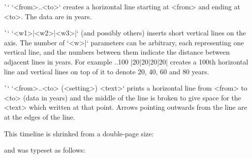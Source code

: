 {{{{\`\tline` `<from>..<to>` creates a horizontal line starting at <from> and
ending at <to>. The data are in years.

\`\tlines` `<w1>|<w2>|<w3>|` (and possibly others) inserts short vertical lines on the axis.
The number of `<w>|` parameters can be arbitrary, each representing one
vertical line, and the numbers between them indicate the distance between adjacent lines in
years. For example
\begtt
{}..100
|20|20|20|20|
\endtt
creates a 100th horizontal line and vertical lines on top of it to denote 20,
40, 60 and 80 years.

\`\arrowtext` `<from>..<to> (<setting>) {<text>}`
prints a horizontal line from <from> to <to> (data in years)
and the middle of the line is broken to give space for the <text> which written at that point. 
Arrows pointing outwards from the line are at the edges of the line.

This timeline is shrinked from a double-page size:
\medskip
{}\hsize
{}

and was typeset as follows:

}}}}
